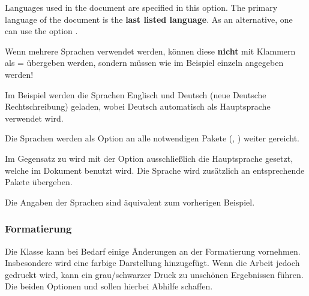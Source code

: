 \documentclass[babel=english,highlight=false]{skdoc}
\begin{document}
                \medskip

                Languages used in the document are specified in this option. The primary language of the document is the \textbf{last listed language}. As an alternative, one can use the option .


                \begin{warning}{}
                    Wenn mehrere Sprachen verwendet werden, können diese \textbf{nicht} mit Klammern als  =  übergeben werden, sondern müssen wie im Beispiel einzeln angegeben werden!
                \end{warning}

                Im Beispiel werden die Sprachen Englisch und Deutsch (neue Deutsche Rechtschreibung) geladen, wobei Deutsch automatisch als Hauptsprache verwendet wird.

                Die Sprachen werden als Option an alle notwendigen Pakete (, ) weiter gereicht.\medskip

                Im Gegensatz zu  wird mit der Option ausschließlich die Hauptsprache gesetzt, welche im Dokument benutzt wird. Die Sprache wird zusätzlich an entsprechende Pakete übergeben.



                Die Angaben der Sprachen sind äquivalent zum vorherigen Beispiel.\medskip

            \subsubsection{Formatierung}\label{subsub:format}
                Die Klasse kann bei Bedarf einige Änderungen an der Formatierung vornehmen. Insbesondere wird eine farbige Darstellung hinzugefügt. Wenn die Arbeit jedoch gedruckt wird, kann ein grau/schwarzer Druck zu unschönen Ergebnissen führen. Die beiden Optionen  und  sollen hierbei Abhilfe schaffen.
\end{document}
